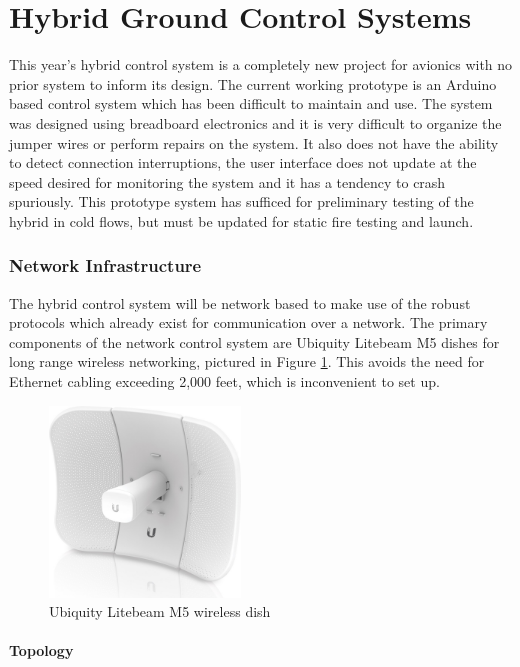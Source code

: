 \part{Hybrid Ground Control Systems}

This year's hybrid control system is a completely new project for avionics with no prior system to inform its design.
The current working prototype is an Arduino based control system which has been difficult to maintain and use. The
system was designed using breadboard electronics and it is very difficult to organize the jumper wires or perform
repairs on the system. It also does not have the ability to detect connection interruptions, the user interface does
not update at the speed desired for monitoring the system and it has a tendency to crash spuriously. This prototype
system has sufficed for preliminary testing of the hybrid in cold flows, but must be updated for static fire testing
and launch.

\section{Network Infrastructure}

The hybrid control system will be network based to make use of the robust protocols which already exist for
communication over a network. The primary components of the network control system are Ubiquity Litebeam M5 dishes for
long range wireless networking, pictured in Figure \ref{fig:ubiquity-dish}. This avoids the need for Ethernet cabling
exceeding 2,000 feet, which is inconvenient to set up.

\begin{figure}[H]
    \center
    \includegraphics[width=2in]{assets/images/ubiquity-dish.jpg}
    \caption{Ubiquity Litebeam M5 wireless dish \cite{ubiquity-dish}}
    \label{fig:ubiquity-dish}
\end{figure}

\subsection{Topology}

